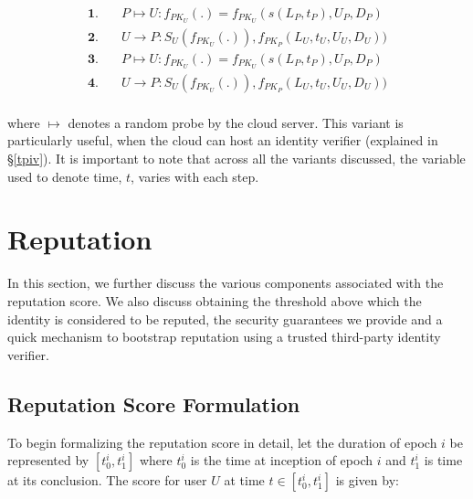 \documentclass[letterpaper,twocolumn]{sig-alternate}
\begin{document}
\vspace{-2mm}
\begin{align*}
\textbf{1}.& \quad P \longmapsto U: f_{PK_U}(.) = f_{PK_U}(s(L_{P},t_{P}),U_P,D_P) \\
\textbf{2}.& \quad U \rightarrow P: S_U(f_{PK_U}(.)),f_{PK_P}(L_U,t_U,U_U,D_U)) \\
\textbf{3}.& \quad P \longmapsto U: f_{PK_U}(.) = f_{PK_U}(s(L_{P},t_{P}),U_P,D_P) \\
\textbf{4}.& \quad U \rightarrow P: S_U(f_{PK_U}(.)),f_{PK_P}(L_U,t_U,U_U,D_U)) \\
\end{align*}
\vspace{-6mm}

where $\longmapsto$ denotes a random probe by the cloud server. This variant is particularly useful, when the cloud can host an identity verifier (explained in \S \ref{tpiv}). It is important to note that across all the variants discussed, the variable used to denote time, $t$, varies with each step. 
 \section{Reputation}
\label{reputation}

In this section, we further discuss the various components associated with the reputation score. We also discuss obtaining the threshold above which the identity is considered to be reputed, the security guarantees we provide and a quick mechanism to bootstrap reputation using a trusted third-party identity verifier. 

\subsection{Reputation Score Formulation}
\label{formulation}

To begin formalizing the reputation score in detail, let the duration of epoch $i$ be represented by $[t^i_{0},t^i_1]$ where $t^i_{0}$ is the time at inception of epoch $i$ and $t^i_1$ is time at its conclusion. The score for user $U$ at time $t \in [t^i_{0},t^i_1]$ is given by:

\vspace{1.5mm}
\end{document}
